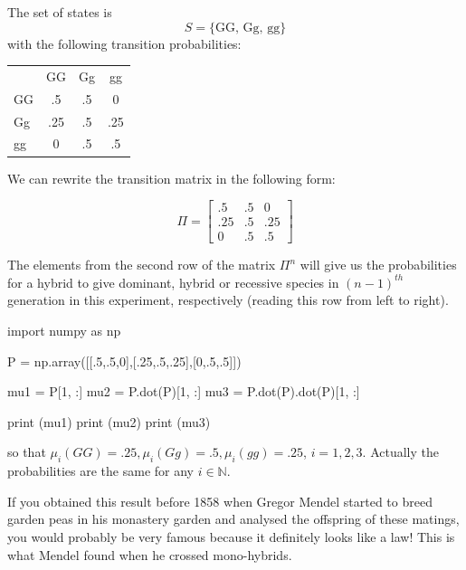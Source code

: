 \cprotEnv\begin{solution}
The set of states is 
\begin{equation*}
S = \{\textrm{GG, Gg, gg}\}
\end{equation*}
with the following transition probabilities:

\begin{table}[htbp]
\centering
\begin{tabular}{l c c c}
&GG& Gg & gg \\
GG & .5 & .5 & 0 \\
Gg & .25 & .5 & .25 \\
gg & 0 & .5 & .5 \\
\end{tabular}
\end{table}
\noindent
We can rewrite the transition matrix in the following form:

\begin{equation*}
\Pi =
\begin{bmatrix}
.5 &.5 &0\\
.25 &.5 &.25\\
0 &.5 &.5
\end{bmatrix}
\end{equation*}

The elements from the second row of the matrix $\Pi^n$ will give us the probabilities for a hybrid to give dominant, hybrid or recessive species in $(n − 1)^{th}$ generation in this experiment, respectively (reading this row from left to right).
\begin{ipython}
import numpy as np

P = np.array([[.5,.5,0],[.25,.5,.25],[0,.5,.5]])

mu1 = P[1, :]
mu2 = P.dot(P)[1, :]
mu3 = P.dot(P).dot(P)[1, :]

print (mu1)
print (mu2)
print (mu3)
\end{ipython}
\begin{ioutput}
[0.25 0.5  0.25]
[0.25 0.5  0.25]
[0.25 0.5  0.25]
\end{ioutput}
so that $\mu_i(GG) = .25, \mu_i(Gg) = .5, \mu_i(gg) = .25$, $i = 1, 2, 3$.
Actually the probabilities are the same for any $i \in \mathbb{N}$. 

\begin{curiosity}
If you obtained this result before 1858 when Gregor Mendel started to breed garden peas in his monastery garden and analysed the offspring of these matings, you would probably be very famous because it definitely looks like a law! This is what Mendel found when he crossed mono-hybrids.
\end{curiosity}
\end{solution}
